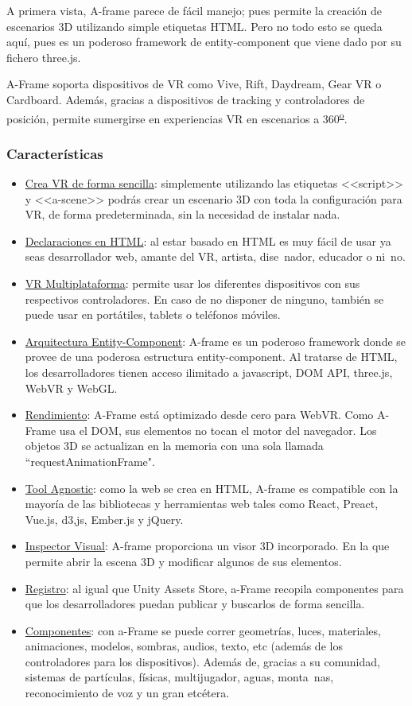 \documentclass[a4paper, 12pt]{book}
\begin{document}
A primera vista, A-frame parece de f\'acil manejo; pues permite la creaci\'on de escenarios 3D utilizando simple etiquetas HTML. Pero no todo esto se queda aqu\'i, pues es un poderoso framework de entity-component que viene dado por su fichero three.js.

A-Frame soporta dispositivos de VR como Vive, Rift, Daydream, Gear VR o Cardboard.
Adem\'as, gracias a dispositivos de tracking y controladores de posici\'on, permite sumergirse en experiencias VR en escenarios a 360\textsuperscript{\underline{o}}.
\subsubsection{Caracter\'isticas}
\begin{itemize}
\item \underline{Crea VR de forma sencilla}: simplemente utilizando las etiquetas <<script>> y <<a-scene>> podr\'as crear un escenario 3D con toda la configuraci\'on para VR, de forma predeterminada, sin la necesidad de instalar nada.
\item \underline{Declaraciones en HTML}: al estar basado en HTML es muy f\'acil de usar ya seas desarrollador web, amante del VR, artista, dise~nador, educador o ni~no.
\item \underline{VR Multiplataforma}: permite usar los diferentes dispositivos con sus respectivos controladores. En caso de no disponer de ninguno, tambi\'en se puede usar en port\'atiles, tablets o tel\'efonos  m\'oviles.
\item \underline{Arquitectura Entity-Component}: A-frame es un poderoso framework donde se provee de una poderosa estructura entity-component. Al tratarse de HTML, los desarrolladores tienen acceso ilimitado a javascript, DOM API, three.js, WebVR y WebGL.
\item \underline{Rendimiento}: A-Frame est\'a optimizado desde cero para WebVR. Como A-Frame usa el DOM, sus elementos no tocan el motor del navegador. Los objetos 3D se actualizan en la memoria con una sola llamada ``requestAnimationFrame".
\item \underline{Tool Agnostic}: como la web se crea en HTML, A-frame es compatible con la mayor\'ia de las bibliotecas y herramientas web tales como React, Preact, Vue.js, d3,js, Ember.js y jQuery.
\item \underline{Inspector Visual}: A-frame proporciona un visor 3D incorporado. En la que permite abrir la escena 3D y modificar algunos de sus elementos.
\item \underline{Registro}: al igual que Unity Assets Store, a-Frame recopila componentes para que los desarrolladores puedan publicar y buscarlos de forma sencilla.
\item \underline{Componentes}: con a-Frame se puede correr geometr\'ias, luces, materiales, animaciones, modelos, sombras, audios, texto, etc (adem\'as de los controladores para los dispositivos). Adem\'as de, gracias a su comunidad, sistemas de part\'iculas, f\'isicas, multijugador, aguas, monta~nas, reconocimiento de voz y un gran etc\'etera.
\end{itemize}
\end{document}
